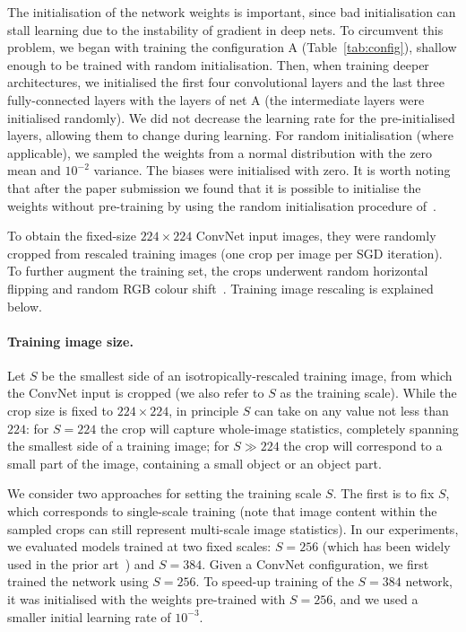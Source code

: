 \documentclass{article} %
\newcommand{\tblref}[1]{Table~\ref{#1}}
\begin{document}
The initialisation of the network weights is important, since bad initialisation can stall learning due to the instability of gradient in deep nets.
To circumvent this problem, we began with training the configuration A (\tblref{tab:config}), shallow enough to be trained with random initialisation. Then, when training deeper
architectures, we initialised the first four convolutional layers and the last three fully-connected layers with the layers of net A (the intermediate layers were
initialised randomly). We did not decrease the learning rate for the pre-initialised layers, allowing them to change during learning.
For random initialisation (where applicable), we sampled the weights from a normal distribution with the zero mean and $10^{-2}$ variance. The biases were initialised with zero.
It is worth noting that after the paper submission we found that it is possible to initialise the weights without pre-training by using the random initialisation procedure of~\citet{Glorot10}.

To obtain the fixed-size $224 \times 224$ ConvNet input images, they were randomly cropped from rescaled training images (one crop per image per SGD iteration).
To further augment the training set, the crops underwent random horizontal flipping and random RGB colour shift~\citep{Krizhevsky12}. Training image rescaling is explained below.

\paragraph{Training image size.}
Let $S$ be the smallest side of an isotropically-rescaled training image, from which the ConvNet input is cropped (we also refer to $S$ as the training scale).
While the crop size is fixed to $224 \times 224$, in principle $S$ can take on any value not less than $224$: for $S=224$ the crop will capture whole-image statistics, completely spanning the smallest side of a training image;
for $S \gg 224$ the crop will correspond to a small part of the image, containing a small object or an object part.

We consider two approaches for setting the training scale $S$. 
The first is to fix $S$, which corresponds to single-scale training (note that image content within the sampled crops can still represent multi-scale image statistics).
In our experiments, we evaluated models trained at two fixed scales: $S=256$ (which has been widely used in the prior art~\citep{Krizhevsky12,Zeiler13,Sermanet14}) and $S=384$.
Given a \mbox{ConvNet} configuration, we first trained the network using $S=256$. 
To speed-up training of the $S=384$ network, it was initialised with the weights pre-trained with $S=256$, and we used a smaller initial learning rate of $10^{-3}$.
\end{document}

